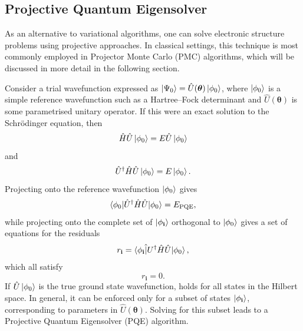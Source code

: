 \documentclass[%
 reprint,
 amsmath,amssymb,
 aps,
]{revtex4-2}
\begin{document}
\subsection{Projective Quantum Eigensolver}
As an alternative to variational algorithms, one can solve electronic structure problems using projective approaches. In classical settings, this technique is most commonly employed in Projector Monte Carlo (PMC) algorithms, which will be discussed in more detail in the following section.

Consider a trial wavefunction expressed as \mbox{$\ket{\Psi_0} =\hat U (\boldsymbol\theta)\ket{\phi_0}$}, where $\ket{\phi_0}$ is a simple reference wavefunction such as a Hartree--Fock determinant and $\hat U(\mathbf{\boldsymbol\theta})$ is some parametrised unitary operator.
If this were an exact solution to the Schr\"odinger equation, then
\begin{equation}
\hat H \hat U \ket{\phi_0} = E \hat U\ket{\phi_0}
\end{equation}
and
\begin{equation}
\hat U^\dagger \hat H \hat U \ket{\phi_0} = E \ket{\phi_0}.
\label{eq:linked}
\end{equation}
Projecting  onto the reference wavefunction $\ket{\phi_0}$ gives
\begin{equation}
    \braket{\phi_0|\hat U^\dagger \hat H \hat U |\phi_0} = E_\mathrm{PQE},
    \label{eq:epqe}
\end{equation}
while projecting onto the complete set of $\ket{\phi_\mathbf{i}}$ orthogonal to $\ket{\phi_0}$ gives a set of equations for the residuals
\begin{equation}
 r_\mathbf{i} = \braket{\phi_\mathbf{i}\hat| U^\dagger \hat H \hat U |\phi_0},
\end{equation}
which all satisfy
\begin{equation}
    r_\mathbf{i} = 0.
     \label{eq:resid}
\end{equation}
If $\hat U\ket{\phi_0}$ is the true ground state wavefunction,  holds for all states in the Hilbert space. In general, it can be enforced only for a subset of states $\ket{\phi_\mathbf{i}}$, corresponding to parameters in $\hat U(\boldsymbol \theta)$.  Solving  for this subset leads to a Projective Quantum Eigensolver (PQE)\cite{Stair2021} algorithm.
\end{document}
